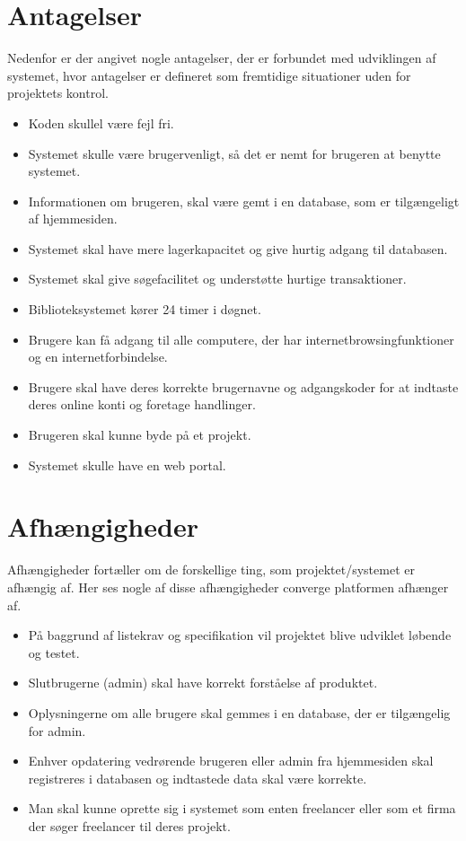

\section{Antagelser}
Nedenfor er der angivet nogle antagelser, der er forbundet med udviklingen af systemet, hvor antagelser er defineret som fremtidige situationer uden for projektets kontrol. 

\begin{itemize}
    \item Koden skullel være fejl fri.
    \item Systemet skulle være brugervenligt, så det er nemt for brugeren at benytte systemet.
    \item Informationen om brugeren, skal være gemt i en database, som er tilgængeligt af hjemmesiden.
    \item Systemet skal have mere lagerkapacitet og give hurtig adgang til databasen.
    \item Systemet skal give søgefacilitet og understøtte hurtige transaktioner.
    \item Biblioteksystemet kører 24 timer i døgnet.
    \item Brugere kan få adgang til alle computere, der har internetbrowsingfunktioner og en internetforbindelse.
    \item Brugere skal have deres korrekte brugernavne og adgangskoder for at indtaste deres online konti og foretage handlinger.
    \item Brugeren skal kunne byde på et projekt.
    \item Systemet skulle have en web portal.
     
  
\end{itemize}

\section{Afhængigheder}
Afhængigheder fortæller om de forskellige ting, som projektet/systemet er afhængig af. Her ses nogle af disse afhængigheder converge platformen afhænger af.
\begin{itemize}
    
    \item På baggrund af listekrav og specifikation vil projektet blive udviklet løbende og testet.
    \item Slutbrugerne (admin) skal have korrekt forståelse af produktet.
    \item  Oplysningerne om alle brugere skal gemmes i en database, der er tilgængelig for admin.
    \item Enhver opdatering vedrørende brugeren eller admin fra hjemmesiden skal registreres i databasen og indtastede data skal være korrekte.
    \item Man skal kunne oprette sig i systemet som enten freelancer eller som et firma der søger freelancer til deres projekt.

\end{itemize}




